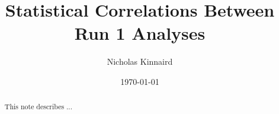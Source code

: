 \documentclass[12pt,letterpaper]{article}
\title{Statistical Correlations Between Run 1 Analyses}
\author{Nicholas Kinnaird}
\date{\today}
\begin{document}
\maketitle

\begin{abstract}
	This note describes ... 
\end{abstract}










\printbibliography

\end{document}
